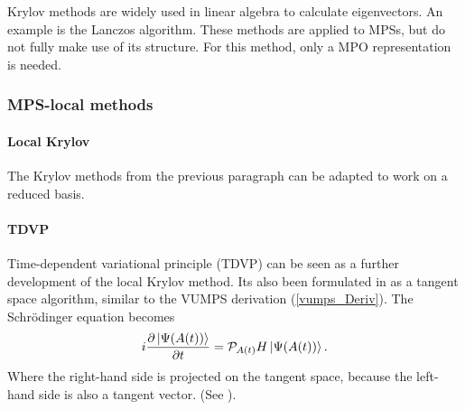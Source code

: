Krylov methods are widely used in linear algebra to calculate eigenvectors. An example is the Lanczos algorithm. These methods are applied to \Glspl{MPS}, but do not fully make use of its structure. For this method, only a \Gls{MPO} representation is needed.

\subsubsection{MPS-local methods}

\paragraph{Local Krylov}
The Krylov methods from the previous paragraph can be adapted to work on a reduced basis.

\paragraph{TDVP} Time-dependent variational principle (TDVP) can be seen as a further development of the local Krylov method. Its also been formulated in as a tangent space algorithm, similar to the \Gls{VUMPS} derivation (\cref{vumps_Deriv}). The Schrödinger equation becomes
\begin{equation}
    i \frac{\partial \ket{ \Psi( A(t) ) }}{\partial t} = \mathcal{P}_{ A ( t) }  H  \ket{ \Psi( A (t) ) } .
\end{equation}
Where the right-hand side is projected on the tangent space, because the left-hand side is also a tangent vector. (See \cite{Vanderstraeten2019}).

